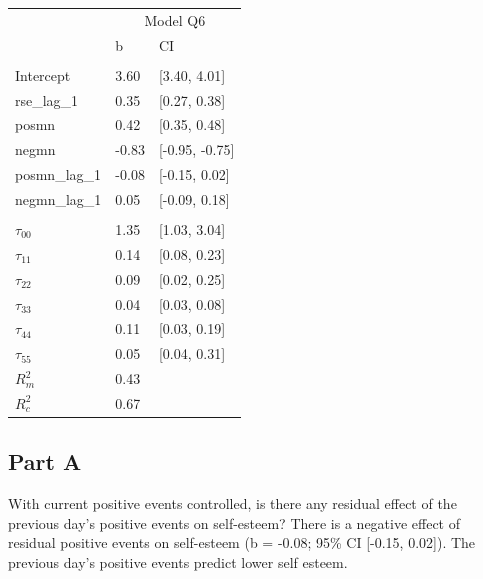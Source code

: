 \documentclass[]{article}
\begin{document}
\begin{table}[H]
\centering
\begin{tabular}{lll}
\toprule
\multicolumn{1}{c}{ } & \multicolumn{2}{c}{Model Q6} \\
\cmidrule(l{2pt}r{2pt}){2-3}
 & b & CI\\
\midrule
\addlinespace[0.3em]
\multicolumn{3}{l}{\textbf{Fixed}}\\
\hspace{1em}Intercept & 3.60 & [3.40, 4.01]\\
\hspace{1em}rse\_lag\_1 & 0.35 & [0.27, 0.38]\\
\hspace{1em}posmn & 0.42 & [0.35, 0.48]\\
\hspace{1em}negmn & -0.83 & [-0.95, -0.75]\\
\hspace{1em}posmn\_lag\_1 & -0.08 & [-0.15, 0.02]\\
\hspace{1em}negmn\_lag\_1 & 0.05 & [-0.09, 0.18]\\
\addlinespace[0.3em]
\multicolumn{3}{l}{\textbf{Random}}\\
\hspace{1em}$\tau_{00}$ & 1.35 & [1.03, 3.04]\\
\hspace{1em}$\tau_{11}$ & 0.14 & [0.08, 0.23]\\
\hspace{1em}$\tau_{22}$ & 0.09 & [0.02, 0.25]\\
\hspace{1em}$\tau_{33}$ & 0.04 & [0.03, 0.08]\\
\hspace{1em}$\tau_{44}$ & 0.11 & [0.03, 0.19]\\
\hspace{1em}$\tau_{55}$ & 0.05 & [0.04, 0.31]\\
$R^2_m$ & 0.43 & \\
$R^2_c$ & 0.67 & \\
\bottomrule
\end{tabular}
\end{table}

\subsection{Part A}\label{part-a-4}

With current positive events controlled, is there any residual effect of
the previous day's positive events on self-esteem? There is a negative
effect of residual positive events on self-esteem (b = -0.08; 95\% CI
{[}-0.15, 0.02{]}). The previous day's positive events predict lower
self esteem.
\end{document}
